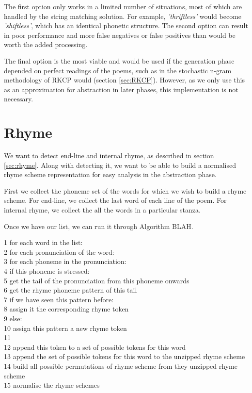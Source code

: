 The first option only works in a limited number of situations, most of which are handled by the string matching solution. For example, \textit{'thriftless'} would become \textit{'shiftless'}, which has an identical phonetic structure. The second option can result in poor performance and more false negatives or false positives than would be worth the added processing.

The final option is the most viable and would be used if the generation phase depended on perfect readings of the poems, such as in the stochastic n-gram methodology of RKCP would (section \ref{sec:RKCP}). However, as we only use this as an approximation for abstraction in later phases, this implementation is not necessary.


\section{Rhyme}

We want to detect end-line and internal rhyme, as described in section \ref{sec:rhyme}. Along with detecting it, we want to be able to build a normalised rhyme scheme representation for easy analysis in the abstraction phase. 

First we collect the phoneme set of the words for which we wish to build a rhyme scheme. For end-line, we collect the last word of each line of the poem. For internal rhyme, we collect the all the words in a particular stanza.

Once we have our list, we can run it through Algorithm BLAH.

1 for each word in the list:\\
2 	for each pronunciation of the word:\\
3		for each phoneme in the pronunciation:\\
4			if this phoneme is stressed:\\
5				get the tail of the pronunciation from this phoneme onwards\\
6				get the rhyme phoneme pattern of this tail\\
7				if we have seen this pattern before: \\
8					assign it the corresponding rhyme token\\
9				else:\\
10					assign this pattern a new rhyme token\\
11				\\
12				append this token to a set of possible tokens for this word\\				
13	append the set of possible tokens for this word to the unzipped rhyme scheme\\
14 build all possible permutations of rhyme scheme from they unzipped rhyme scheme\\
15 normalise the rhyme schemes\\
	
